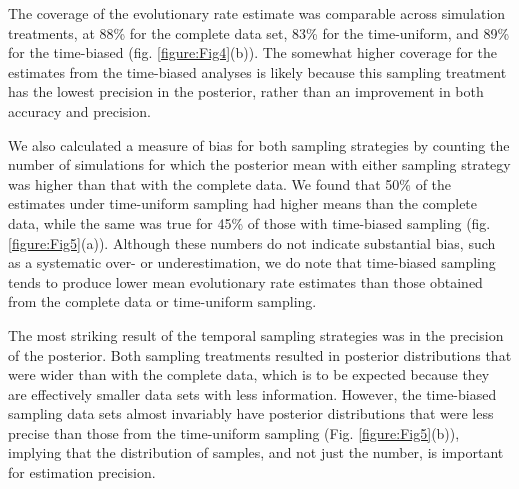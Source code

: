 \documentclass[11pt]{article}
\begin{document}
The coverage of the evolutionary rate estimate was comparable across simulation treatments, at 88\% for the complete data set, 83\% for the time-uniform, and 89\% for the time-biased (fig. \ref{figure:Fig4}(b)). The somewhat higher coverage for the estimates from the time-biased analyses is likely because this sampling treatment has the lowest precision in the posterior, rather than an improvement in both accuracy and precision.

We also calculated a measure of bias for both sampling strategies by counting the number of simulations for which the posterior mean with either sampling strategy was higher than that with the complete data. We found that 50\% of the estimates under time-uniform sampling had higher means than the complete data, while the same was true for 45\% of those with time-biased sampling (fig. \ref{figure:Fig5}(a)). Although these numbers do not indicate substantial bias, such as a systematic over- or underestimation, we do note that time-biased sampling tends to produce lower mean evolutionary rate estimates than those obtained from the complete data or time-uniform sampling.

The most striking result of the temporal sampling strategies was in the precision of the posterior. Both sampling treatments resulted in posterior distributions that were wider than with the complete data, which is to be expected because they are effectively smaller data sets with less information. However, the time-biased sampling data sets almost invariably have posterior distributions that were less precise than those from the time-uniform sampling (Fig. \ref{figure:Fig5}(b)), implying that the distribution of samples, and not just the number, is important for estimation precision.
\end{document}
